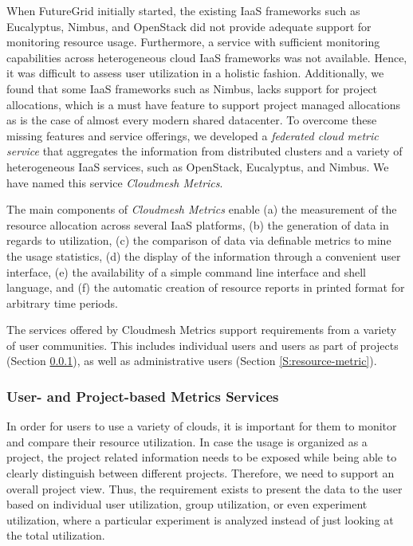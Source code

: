 \documentclass{tex/sig-alternate-2013}
\begin{document}
{%

When FutureGrid initially started, the existing IaaS frameworks such as Eucalyptus, Nimbus, and OpenStack did not provide adequate support for monitoring resource usage. Furthermore, a service with sufficient monitoring capabilities across heterogeneous cloud IaaS frameworks was not available. Hence, it was difficult to assess user utilization in a holistic fashion. Additionally, we found that some IaaS frameworks such as Nimbus, lacks support for project allocations, which is a must have feature to support project managed allocations as is the case of almost every modern shared datacenter.  To overcome these missing features and service offerings, we developed a {\em federated cloud metric service} that aggregates the information from distributed clusters and a variety of heterogeneous IaaS services, such as OpenStack, Eucalyptus, and Nimbus. We have named this service {\em Cloudmesh Metrics}.

The main components of {\em Cloudmesh Metrics} enable (a) the measurement of the resource allocation across several IaaS platforms, (b) the generation of data in regards to utilization, (c) the comparison of data via definable metrics to mine the usage statistics, (d) the display of the information through a convenient user interface, (e) the availability of a simple command line interface and shell language, and (f) the automatic creation of resource reports in printed format for arbitrary time periods.

The services offered by Cloudmesh Metrics support requirements from a variety of user communities. This includes individual users and users as part of projects (Section \ref{S:user-metric}), as well as administrative users (Section \ref{S:resource-metric}).



\subsubsection{User- and Project-based Metrics Services}\label{S:user-metric} 

In order for users to use a variety of clouds, it is important for them to monitor and compare their resource utilization. In case the usage is organized as a project, the project related information needs to be exposed while being able to clearly distinguish between different projects. Therefore, we need to support an overall project view.  Thus, the requirement exists to present the data to the user based on individual user utilization, group utilization, or even experiment utilization, where a particular experiment is analyzed instead of just looking at the total utilization.

}
\end{document}
